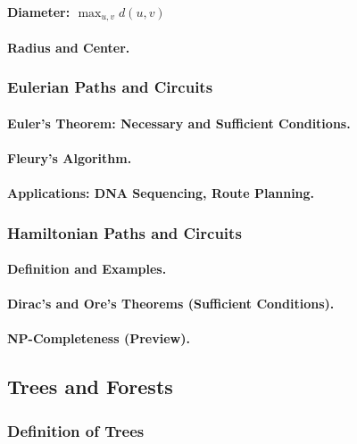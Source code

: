 \paragraph{Diameter: $\max_{u,v} d(u,v)$}
\paragraph{Radius and Center.}

\subsubsection{Eulerian Paths and Circuits}
\paragraph{Euler's Theorem: Necessary and Sufficient Conditions.}
\paragraph{Fleury's Algorithm.}
\paragraph{Applications: DNA Sequencing, Route Planning.}

\subsubsection{Hamiltonian Paths and Circuits}
\paragraph{Definition and Examples.}
\paragraph{Dirac's and Ore's Theorems (Sufficient Conditions).}
\paragraph{NP-Completeness (Preview).}

\subsection{Trees and Forests}
\label{subsec:trees}

\subsubsection{Definition of Trees}
